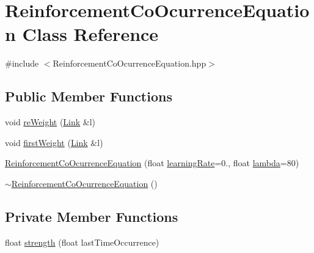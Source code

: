 \hypertarget{class_reinforcement_co_ocurrence_equation}{\section{Reinforcement\+Co\+Ocurrence\+Equation Class Reference}
\label{class_reinforcement_co_ocurrence_equation}
}


{\ttfamily \#include $<$Reinforcement\+Co\+Ocurrence\+Equation.\+hpp$>$}

\subsection*{Public Member Functions}
\begin{DoxyCompactItemize}
\item 
void \hyperlink{class_reinforcement_co_ocurrence_equation_ace1a78861a38cfc6ad58584b8f73a846}{re\+Weight} (\hyperlink{class_link}{Link} \&l)
\item 
void \hyperlink{class_reinforcement_co_ocurrence_equation_ad9ffd4f4ad94858a2522c2e5c519920f}{first\+Weight} (\hyperlink{class_link}{Link} \&l)
\item 
\hyperlink{class_reinforcement_co_ocurrence_equation_af926a0673e23f1d9d301ad10295632ea}{Reinforcement\+Co\+Ocurrence\+Equation} (float \hyperlink{class_reinforcement_co_ocurrence_equation_a643eafe5a80172a58cd54512e57d3421}{learning\+Rate}=0., float \hyperlink{class_reinforcement_co_ocurrence_equation_a698939519d58a0da4a079822a1d65e87}{lambda}=80)
\item 
\hyperlink{class_reinforcement_co_ocurrence_equation_a5c45438e0ac763a2376cf4ec22a4b62c}{$\sim$\+Reinforcement\+Co\+Ocurrence\+Equation} ()
\end{DoxyCompactItemize}
\subsection*{Private Member Functions}
\begin{DoxyCompactItemize}
\item 
float \hyperlink{class_reinforcement_co_ocurrence_equation_aea34a3a75518f1a404a9ee192feb2709}{strength} (float last\+Time\+Occurrence)
\end{DoxyCompactItemize}
